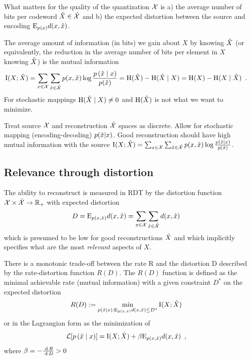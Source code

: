 What matters for the quality of the quantization $\mathcal{X}$ is a) the average number of bits per codeword $\hat{X} \in \hat{\mathcal{X}}$ and b) the expected distortion between the source and encoding $\mathrm{E}_{p(x)} d(x, \hat{x})$. 

The average amount of information (in bits) we gain about $X$ by knowing $\hat{X}$ (or equivalently, the reduction in the average number of bits per element in $X$ knowing $\hat{X}$) is the mutual information
\begin{equation}
\mathrm{I}(X; \hat{X}) = \sum_{x \in \mathcal{X}} \sum_{\hat{x} \in \hat{\mathcal{X}}} p(x, \hat{x}) \log \frac{ p \left( \hat{x} \mid x \right) }{p(\hat{x})} = \mathrm{H}(\hat{X}) - \mathrm{H}(\hat{X} \mid X)  = \mathrm{H}(X) - \mathrm{H}(X \mid \hat{X}) \enspace .
\end{equation}
For stochastic mappings $\mathrm{H}(\hat{X} \mid X) \neq 0$ and $\mathrm{H}(\hat{X})$ is not what we want to minimize.

\begin{notebox}
\tldr Treat source $\mathcal{X}$ and reconstruction $\hat{\mathcal{X}}$ spaces as discrete. Allow for stochastic mapping (encoding-decoding) $p(\hat{x} | x)$. Good reconstruction should have high mutual information with the source $\mathrm{I}(X; \hat{X}) = \sum_{x \in \mathcal{X}} \sum_{\hat{x} \in \hat{\mathcal{X}}} p(x, \hat{x}) \log \frac{ p \left( \hat{x} \mid x \right) }{p(\hat{x})}$.
\end{notebox}

\subsection{Relevance through distortion}

The ability to reconstruct is measured in RDT by the distortion function $\mathcal{X} \times \hat{\mathcal{X}} \to \mathbb{R}_{+}$ with expected distortion 
\begin{equation}
D = \mathrm{E}_{p(x, \hat{x})} d(x, \hat{x}) = \sum_{x \in \mathcal{X}} \sum_{\hat{x} \in \hat{\mathcal{X}}} d(x, \hat{x})
\end{equation}
which is presumed to be low for good reconstructions $\hat{X}$ and which implicitly specifies what are the most \emph{relevant} aspects of $X$.

There is a monotonic trade-off between the rate R and the distortion D described by the rate-distortion function $R(D)$.
The $R(D)$ function is defined as the minimal achievable rate (mutual information) with a given constraint $D^*$ on the expected distortion
\begin{equation}
R(D) := \min_{p \left( \hat{x} \mid x \right): \mathrm{E}_{p(x, \hat{x})} d(x, \hat{x}) \leq D^*} \mathrm{I}(X; \hat{X})
\end{equation}
or in the Lagrangian form as the minimization of 
\begin{equation}
\mathcal{L}[ p \left( \hat{x} \mid x \right)] = \mathrm{I}(X; \hat{X}) + \beta \mathrm{E}_{p(x, \hat{x})} d(x, \hat{x}) \enspace ,
\end{equation}
where $\beta = -\frac{\; \text{d} \, R}{\; \text{d} \, D} > 0$

